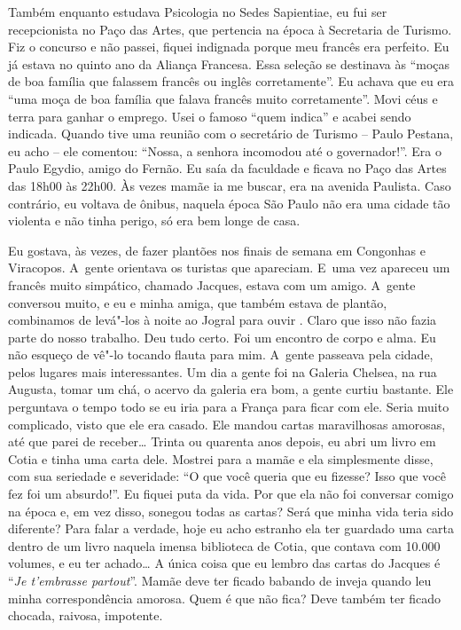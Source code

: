 Também enquanto estudava Psicologia no Sedes Sapientiae, eu fui ser
recepcionista no Paço das Artes, que pertencia na época à Secretaria de
Turismo. Fiz o concurso e não passei, fiquei indignada porque meu
francês era perfeito. Eu já estava no quinto ano da Aliança Francesa.
Essa seleção se destinava às ``moças de boa família que falassem francês
ou inglês corretamente''. Eu achava que eu era ``uma moça de boa família
que falava francês muito corretamente''. Movi céus e terra para ganhar o
emprego. Usei o famoso ``quem indica'' e acabei sendo indicada. Quando
tive uma reunião com o secretário de Turismo -- Paulo Pestana, eu acho
-- ele comentou: ``Nossa, a senhora incomodou até o governador!''. Era o
Paulo Egydio, amigo do Fernão. Eu saía da faculdade e ficava no Paço das
Artes das 18h00 às 22h00. Às vezes mamãe ia me buscar, era na avenida
Paulista. Caso contrário, eu voltava de ônibus, naquela época São Paulo
não era uma cidade tão violenta e não tinha perigo, só era bem longe de
casa.

Eu gostava, às vezes, de fazer plantões nos finais de semana em
Congonhas e Viracopos. A~gente orientava os turistas que apareciam. E~uma vez apareceu um francês muito simpático, chamado Jacques, estava com
um amigo. A~gente conversou muito, e eu e minha amiga, que também estava
de plantão, combinamos de levá"-los à noite ao Jogral para ouvir .
Claro que isso não fazia parte do nosso trabalho. Deu tudo certo. Foi um
encontro de corpo e alma. Eu não esqueço de vê"-lo tocando flauta para
mim. A~gente passeava pela cidade, pelos lugares mais interessantes. Um
dia a gente foi na Galeria Chelsea, na rua Augusta, tomar um chá, o
acervo da galeria era bom, a gente curtiu bastante. Ele perguntava o
tempo todo se eu iria para a França para ficar com ele. Seria muito
complicado, visto que ele era casado. Ele mandou cartas maravilhosas
amorosas, até que parei de receber… Trinta ou quarenta anos
depois, eu abri um livro em Cotia e tinha uma carta dele. Mostrei para a
mamãe e ela simplesmente disse, com sua seriedade e severidade: ``O que
você queria que eu fizesse? Isso que você fez foi um absurdo!''. Eu
fiquei puta da vida. Por que ela não foi conversar comigo na época e, em
vez disso, sonegou todas as cartas? Será que minha vida teria sido
diferente? Para falar a verdade, hoje eu acho estranho ela ter guardado
uma carta dentro de um livro naquela imensa biblioteca de Cotia, que
contava com 10.000 volumes, e eu ter achado… A única coisa que eu
lembro das cartas do Jacques é ``\emph{Je t'embrasse partout}''. Mamãe
deve ter ficado babando de inveja quando leu minha correspondência
amorosa. Quem é que não fica? Deve também ter ficado chocada, raivosa,
impotente.


